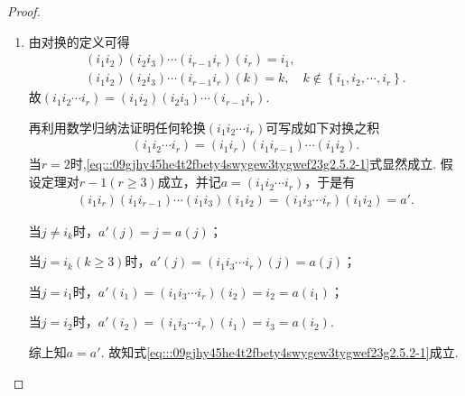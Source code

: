 \documentclass[../../main.tex]{subfiles}%
\begin{document}
\begin{proof}
\begin{enumerate}[(1)]
\item 由对换的定义可得
\begin{gather*}
(i_1i_2)(i_2i_3)\cdots (i_{r-1}i_r)\left( i_r \right) =i_1,
\\
(i_1i_2)(i_2i_3)\cdots (i_{r-1}i_r)\left( k \right) =k,\quad k\notin \left\{ i_1,i_2,\cdots ,i_r \right\} .
\end{gather*}
故$(i_1i_2\cdots i_r)=(i_1i_2)(i_2i_3)\cdots (i_{r-1}i_r).$

再利用数学归纳法证明任何轮换$(i_1 i_2 \cdots i_r)$可写成如下对换之积
\begin{align}
(i_1 i_2 \cdots i_r) = (i_1 i_r)(i_1 i_{r-1}) \cdots (i_1 i_2). \label{eq:::09gjhy45he4t2fbety4swygew3tygwef23g2.5.2-1}
\end{align}
当$r = 2$时,\eqref{eq:::09gjhy45he4t2fbety4swygew3tygwef23g2.5.2-1}式显然成立. 假设定理对$r - 1(r \geqslant 3)$成立，并记$a = (i_1 i_2 \cdots i_r)$，于是有
\begin{align*}
(i_1 i_r)(i_1 i_{r-1}) \cdots (i_1 i_3)(i_1 i_2) = (i_1 i_3 \cdots i_r)(i_1 i_2) = a'.
\end{align*}

当$j \neq i_k$时，$a'(j) = j = a(j)$；

当$j = i_k(k \geqslant 3)$时，$a'(j) = (i_1 i_3 \cdots i_r)(j) = a(j)$；

当$j = i_1$时，$a'(i_1) = (i_1 i_3 \cdots i_r)(i_2) = i_2 = a(i_1)$；

当$j = i_2$时，$a'(i_2) = (i_1 i_3 \cdots i_r)(i_1) = i_3 = a(i_2)$.

综上知$a=a'.$
故知式\eqref{eq:::09gjhy45he4t2fbety4swygew3tygwef23g2.5.2-1}成立.
\end{enumerate}

\end{proof}
\end{document}
